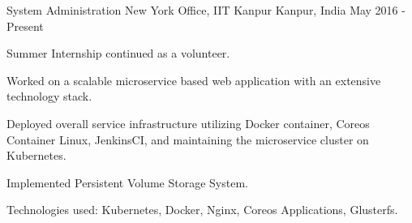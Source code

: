 

\begin{cventries}

  \cventry
    {System Administration} %
    {New York Office, IIT Kanpur} %
    {Kanpur, India} %
    {May 2016 - Present} %
    {
      \begin{cvitems} %
        \item {Summer Internship continued as a volunteer.}
        \item {Worked on a scalable microservice based web application with an extensive technology stack.}
        \item {Deployed overall service infrastructure utilizing Docker container, Coreos Container Linux, JenkinsCI, and maintaining the microservice cluster on Kubernetes.}
        \item {Implemented Persistent Volume Storage System.}
        \item {Technologies used: Kubernetes, Docker, Nginx, Coreos Applications, Glusterfs.}
      \end{cvitems}
    }

\end{cventries}
